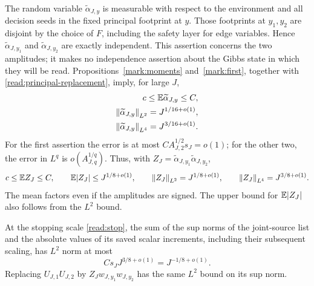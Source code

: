The random variable $\widetilde\alpha_{J,y}$ is measurable with respect
to the environment and all decision seeds in the fixed principal
footprint at $y$.  Those footprints at $y_1,y_2$ are disjoint by the
choice of $F$, including the safety layer for edge variables.  Hence
$\widetilde\alpha_{J,y_1}$ and $\widetilde\alpha_{J,y_2}$ are exactly
independent.  This assertion concerns the two amplitudes; it makes no
independence assertion about the Gibbs state in which they will be read.
Propositions~\ref{mark:moments} and~\ref{mark:first}, together with
\eqref{read:principal-replacement}, imply, for large $J$,
\begin{equation}
 \begin{split}
  c\le \mathbb E\widetilde\alpha_{J,y}\le C,\\
  \left\lVert\widetilde\alpha_{J,y}\right\rVert_{L^2}
       =J^{1/16+o(1)},\\
  \left\lVert\widetilde\alpha_{J,y}\right\rVert_{L^4}
       =J^{3/16+o(1)}.
 \end{split}
 \label{read:local-moments}
\end{equation}
For the first assertion the error is at most
$C A_{J,2}^{1/2}s_J=o(1)$; for the other two, the error in $L^q$ is
$o(A_{J,q}^{1/q})$.  Thus, with
$Z_J=\widetilde\alpha_{J,y_1}\widetilde\alpha_{J,y_2}$,
\begin{equation}
 c\le\mathbb E Z_J\le C,
 \qquad \mathbb E|Z_J|\le J^{1/8+o(1)},
 \qquad \left\lVert Z_J\right\rVert_{L^2}=J^{1/8+o(1)},
 \qquad \left\lVert Z_J\right\rVert_{L^4}=J^{3/8+o(1)}.
 \label{read:product-moments}
\end{equation}
The mean factors even if the amplitudes are signed.  The upper bound
for $\mathbb E|Z_J|$ also follows from the $L^2$ bound.

\begin{lemma}
\label{read:merge}
At the stopping scale \eqref{read:stop}, the sum of the sup norms of the
joint-source list and the absolute values of its saved scalar
increments, including their subsequent scaling, has $L^2$ norm at most
\begin{equation}
 C s_J J^{3/8+o(1)}=J^{-1/8+o(1)}.
 \label{read:merge-bound}
\end{equation}
Replacing $U_{J,1}U_{J,2}$ by $Z_Jw_{J,y_1}w_{J,y_2}$ has the same
$L^2$ bound on its sup norm.
\end{lemma}


